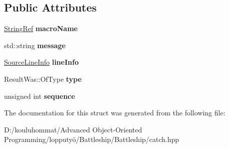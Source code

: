 \subsection*{Public Attributes}
\begin{DoxyCompactItemize}
\item 
\mbox{\label{struct_catch_1_1_message_info_a3ee7cd41def0989d2193bad7101436a0}} 
\mbox{\hyperlink{class_catch_1_1_string_ref}{String\+Ref}} {\bfseries macro\+Name}
\item 
\mbox{\label{struct_catch_1_1_message_info_ab6cd06e050bf426c6577502a5c50e256}} 
std\+::string {\bfseries message}
\item 
\mbox{\label{struct_catch_1_1_message_info_a985165328723e599696ebd8e43195cc5}} 
\mbox{\hyperlink{struct_catch_1_1_source_line_info}{Source\+Line\+Info}} {\bfseries line\+Info}
\item 
\mbox{\label{struct_catch_1_1_message_info_ae928b9117465c696e45951d9d0284e78}} 
Result\+Was\+::\+Of\+Type {\bfseries type}
\item 
\mbox{\label{struct_catch_1_1_message_info_a7f4f57ea21e50160adefce7b68a781d6}} 
unsigned int {\bfseries sequence}
\end{DoxyCompactItemize}


The documentation for this struct was generated from the following file\+:\begin{DoxyCompactItemize}
\item 
D\+:/kouluhommat/\+Advanced Object-\/\+Oriented Programming/lopputyö/\+Battleship/\+Battleship/catch.\+hpp\end{DoxyCompactItemize}
